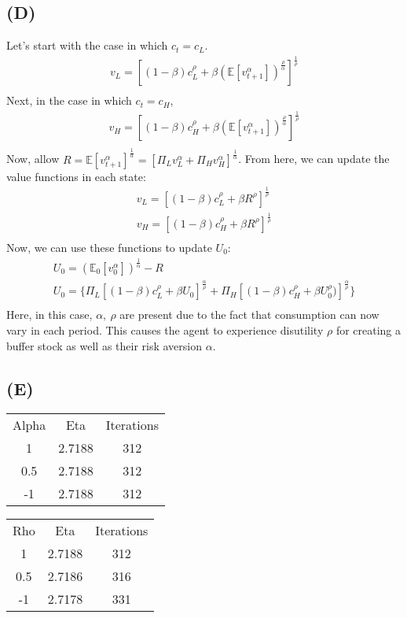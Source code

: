 \documentclass[10pt,a4paper]{article}
\begin{document}
  \subsection*{(D)}
    Let's start with the case in which $c_t = c_L$.
    \begin{gather*}
      v_L = [(1-\beta)c_L^{\rho} + \beta(\mathbb{E}[v_{t+1}^{\alpha}])^{\frac{\rho}{\alpha}}]^{\frac{1}{\rho}} \\
    \end{gather*}
    Next, in the case in which $c_t = c_H$,
    \begin{gather*}
      v_H = [(1-\beta)c_H^{\rho} + \beta(\mathbb{E}[v_{t+1}^{\alpha}])^{\frac{\rho}{\alpha}}]^{\frac{1}{\rho}} \\
    \end{gather*}
    Now, allow $R = \mathbb{E}[v_{t+1}^{\alpha}]^{\frac{1}{\alpha}} = [\Pi_Lv_L^{\alpha} + \Pi_Hv_H^{\alpha}]^{\frac{1}{\alpha}}$. From here, we can update the value functions in each state:
    \begin{gather*}
      v_L = [(1-\beta)c_L^{\rho} + \beta R^{\rho}]^{\frac{1}{\rho}} \\
      v_H = [(1-\beta)c_H^{\rho} + \beta R^{\rho}]^{\frac{1}{\rho}} \\
    \end{gather*}
    Now, we can use these functions to update $U_0$:
    \begin{gather*}
      U_0 = (\mathbb{E}_0[v_0^{\alpha}])^{\frac{1}{\alpha}} -R \\
      U_0 = \{\Pi_L[(1-\beta)c_L^{\rho} + \beta U_0]^{\frac{\alpha}{\rho}} + \Pi_H[(1-\beta)c_H^{\rho}+\beta U_0^{\rho})]^{\frac{\alpha}{\rho}}\} \\
    \end{gather*}
    Here, in this case, $\alpha, \ \rho$ are present due to the fact that consumption can now vary in each period. This causes the agent to experience disutility $\rho$ for creating a buffer stock as well as their risk aversion $\alpha$. 
  \subsection*{(E)}
   \begin{table}[]
    \begin{tabular}{ccc}
    Alpha & Eta    & Iterations \\
    1     & 2.7188 & 312        \\
    0.5   & 2.7188 & 312        \\
    -1    & 2.7188 & 312       
    \end{tabular}
    \end{table}   
    \begin{table}[]
    \begin{tabular}{ccc}
    Rho & Eta    & Iterations \\
    1   & 2.7188 & 312        \\
    0.5 & 2.7186 & 316        \\
    -1  & 2.7178 & 331       
    \end{tabular}
    \end{table}
\end{document}
